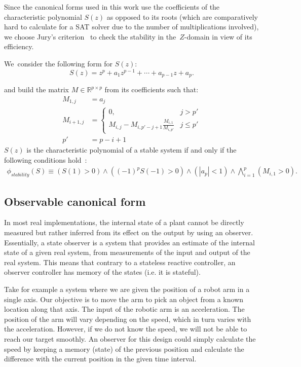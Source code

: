 \documentclass[sigconf]{llncs}
\newcommand{\mat}[1]{{#1}}
\begin{document}
Since the canonical forms used in this work use the coefficients of the
characteristic polynomial $S(z)$ as opposed to its roots (which are
comparatively hard to calculate for a SAT solver due to the number of
multiplications involved), we choose Jury's criterion~\cite{astrom1997computer}
to check the stability in the~$Z$-domain in view of its efficiency.

We~consider the following form for $S(z)$:
%
\begin{equation*}
S(z) = z^{p}+a_1z^{p-1}+\cdots+a_{p-1}z+a_p.
\end{equation*}

and build the matrix
$\mat{M} \in \mathbb{R}^{p \times p}$ from its coefficients such that:
%
\begin{align*}
\mat{M}_{1,j}&=a_j\\
\mat{M}_{i+1,j}&=\left\{
\begin{array}{ll}
0,&j>p'\\
\mat{M}_{i,j}-\mat{M}_{i,p'-j+1}\frac{\mat{M}_{i,1}}{\mat{M}_{i,p'}} &j\leq p'
\end{array}
\right.\\
p'&=p-i+1
\end{align*}
%
$S(z)$ is the characteristic polynomial of a stable system if and
only if the following conditions hold~\cite{astrom1997computer}:
\begin{align*}
\phi_\mathit{stability}(S) \equiv
(S(1) > 0) \wedge ((-1)^p S(-1) > 0) \wedge (|a_p| < 1) \wedge \bigwedge\limits_{i=1}^p (\mat{M}_{i,1} > 0).
\end{align*}

\subsection{Observable canonical form} \label{sec:observable}
In most real implementations, the internal state of a plant cannot be
directly measured but rather inferred from its effect on the output by
using an observer.  Essentially, a state observer is a system that
provides an estimate of the internal state of a given real system,
from measurements of the input and output of the real system.
This means that contrary to a stateless reactive controller, an observer
controller has memory of the states (i.e. it is stateful).

Take for example a system where we are given the position of a robot
arm in a single axis.  Our objective is to move the arm to pick an object 
from a known location along that axis.  The input of the robotic arm is an
acceleration.  The position of the arm will vary depending on the speed, which
in turn varies with the acceleration.  However, if we do not know the speed, we
will not be able to reach our target smoothly.  An observer for this design could
simply calculate the speed by keeping a memory (state) of the previous position
and calculate the difference with the current position in the given time interval.
\end{document}
